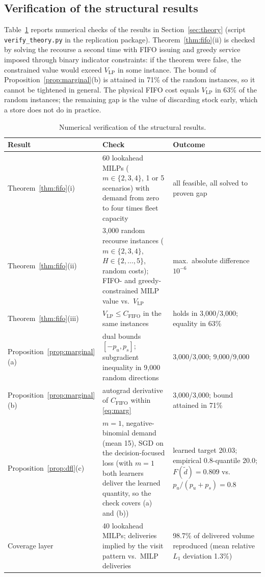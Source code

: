 \subsection{Verification of the structural results}\label{sec:verification}

Table~\ref{tab:verification} reports numerical checks of the results in Section~\ref{sec:theory} (script \texttt{verify\_theory.py} in the replication package). Theorem~\ref{thm:fifo}(ii) is checked by solving the recourse a second time with FIFO issuing and greedy service imposed through binary indicator constraints: if the theorem were false, the constrained value would exceed $V_{\mathrm{LP}}$ in some instance. The bound of Proposition~\ref{prop:marginal}(b) is attained in 71\% of the random instances, so it cannot be tightened in general. The physical FIFO cost equals $V_{\mathrm{LP}}$ in 63\% of the random instances; the remaining gap is the value of discarding stock early, which a store does not do in practice.

\begin{table}[H]
\centering\small
\caption{Numerical verification of the structural results.}\label{tab:verification}
\begin{tabular}{p{3.2cm}p{6.6cm}p{4.0cm}}
\toprule
Result & Check & Outcome \\
\midrule
Theorem~\ref{thm:fifo}(i) & 60 lookahead MILPs ($m\in\{2,3,4\}$, 1 or 5 scenarios) with demand from zero to four times fleet capacity & all feasible, all solved to proven gap \\
Theorem~\ref{thm:fifo}(ii) & 3,000 random recourse instances ($m\in\{2,3,4\}$, $H\in\{2,\dots,5\}$, random costs); FIFO- and greedy-constrained MILP value vs.\ $V_{\mathrm{LP}}$ & max.\ absolute difference $10^{-6}$ \\
Theorem~\ref{thm:fifo}(iii) & $V_{\mathrm{LP}}\le C_{\mathrm{FIFO}}$ in the same instances & holds in 3,000/3,000; equality in 63\% \\
Proposition~\ref{prop:marginal}(a) & dual bounds $[-p_u,p_s]$; subgradient inequality in 9,000 random directions & 3,000/3,000; 9,000/9,000 \\
Proposition~\ref{prop:marginal}(b) & autograd derivative of $C_{\mathrm{FIFO}}$ within \eqref{eq:marg} & 3,000/3,000; bound attained in 71\% \\
Proposition~\ref{prop:dfl}(c) & $m=1$, negative-binomial demand (mean 15), SGD on the decision-focused loss (with $m=1$ both learners deliver the learned quantity, so the check covers (a) and (b)) & learned target 20.03; empirical 0.8-quantile 20.0; $F(\tilde d)=0.809$ vs.\ $p_u/(p_u+p_s)=0.8$ \\
Coverage layer & 40 lookahead MILPs; deliveries implied by the visit pattern vs.\ MILP deliveries & 98.7\% of delivered volume reproduced (mean relative $L_1$ deviation 1.3\%) \\
\bottomrule
\end{tabular}
\end{table}
